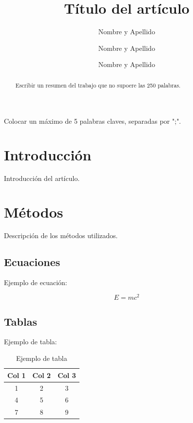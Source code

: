 \documentclass[a4paper,alpha-refs]{eSpectra}
\title{Título del artículo}
\author[1,\authfn{1},]{Nombre y Apellido}
\author[2,\authfn{2}]{Nombre y Apellido}
\author[3]{Nombre y Apellido}
\affil[1]{Afiliación}
\affil[2]{Afiliación}
\begin{document}
\begin{frontmatter}
\maketitle
\begin{abstract}
Escribir un resumen del trabajo que no supoere las 250 palabras.
\end{abstract}

\begin{keywords}
Colocar un máximo de 5 palabras claves, separadas por ";". 
\end{keywords}
\end{frontmatter}

\section{Introducción}

Introducción del artículo.

\section{Métodos}

Descripción de los métodos utilizados.

\subsection{Ecuaciones}

Ejemplo de ecuación:

\begin{equation}
    E = mc^2
\end{equation}

\subsection{Tablas}

Ejemplo de tabla:

\begin{table}[htb]
    \centering
    \caption{Ejemplo de tabla}
    \label{tab:ejemplo}
    \begin{tabular}{|c|c|c|}
        \hline
        Col 1 & Col 2 & Col 3 \\
        \hline
        1 & 2 & 3 \\
        4 & 5 & 6 \\
        7 & 8 & 9 \\
        \hline
    \end{tabular}
\end{table}
\end{document}
